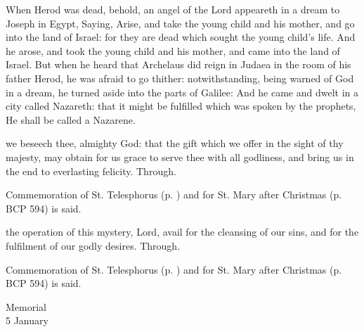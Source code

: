 
 When Herod was dead, behold, an angel of the Lord appeareth in a dream to Joseph in Egypt, Saying, Arise, and take the young child and his mother, and go into the land of Israel: for they are dead which sought the young child's life. And he arose, and took the young child and his mother, and came into the land of Israel. But when he heard that Archelaus did reign in Judaea in the room of his father Herod, he was afraid to go thither: notwithstanding, being warned of God in a dream, he turned aside into the parts of Galilee: And he came and dwelt in a city called Nazareth: that it might be fulfilled which was spoken by the prophets, He shall be called a Nazarene.


\secret
{} we beseech thee, almighty God: that the gift which we offer in the sight of thy majesty, may obtain for us grace to serve thee with all godliness, and bring us in the end to everlasting felicity. Through.

\begin{rubric}
	Commemoration of St. Telesphorus (p. \pageref{TelesphorusSecret}) and for St. Mary after Christmas (p. BCP 594) is said.
\end{rubric}


\postcommunion
{} the operation of this mystery, Lord, avail for the cleansing of our sins, and for the fulfilment of our godly desires. Through.

\begin{rubric}
	Commemoration of St. Telesphorus (p. \pageref{TelesphorusPostcommunion}) and for St. Mary after Christmas (p. BCP 594) is said.
\end{rubric}


\begin{inhead}
    {Memorial\\
5 January}
\end{inhead}

